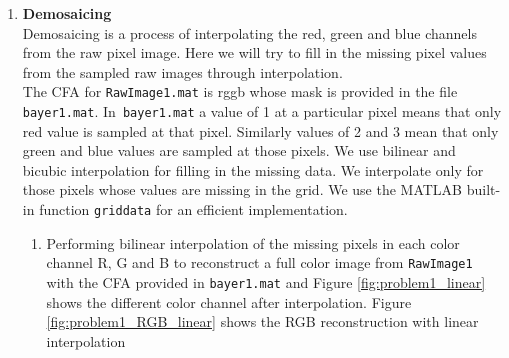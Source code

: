 \documentclass[11pt, a4]{article}
\begin{document}
\begin{enumerate}
		\item \textbf{Demosaicing}\\
		Demosaicing is a process of interpolating the red, green and blue channels from
		the raw pixel image. Here we will try to fill in the missing pixel values from
		the sampled raw images through interpolation. \\
		 The CFA for \texttt{RawImage1.mat} is rggb whose mask is provided in the file
		\texttt{bayer1.mat}. In\texttt{ bayer1.mat} a value of 1 at a particular pixel means that only
		red value is sampled at that pixel. Similarly values of 2 and 3 mean that
		only green and blue values are sampled at those pixels. We use bilinear and
		bicubic interpolation for filling in the missing data. We interpolate only for
		those pixels whose values are missing in the grid. We use the MATLAB built-in
		function \texttt{griddata} for an efficient implementation.
		\begin{enumerate}
			\item Performing bilinear interpolation of the missing pixels in each color channel	R, G and B to reconstruct a full color image from \texttt{RawImage1} with the CFA provided in \texttt{bayer1.mat} and Figure \ref{fig:problem1_linear} shows the different color channel after interpolation. Figure \ref{fig:problem1_RGB_linear} shows the RGB reconstruction with linear interpolation
			\begin{figure}[H]
				\centering
\end{figure}
\end{enumerate}
\end{enumerate}
\end{document}

